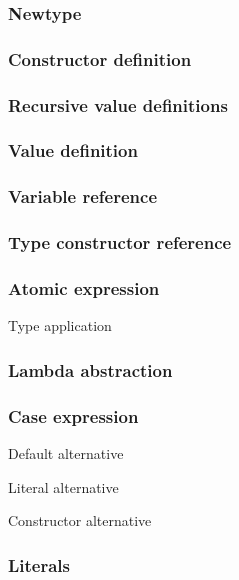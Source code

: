 \subsubsection{Newtype}





\subsubsection{Constructor definition}



\subsubsection{Recursive value definitions}



\subsubsection{Value definition}




\subsubsection{Variable reference}

\subsubsection{Type constructor reference}

\subsubsection{Atomic expression}

Type application

\subsubsection{Lambda abstraction}


\subsubsection{Case expression}

Default alternative

Literal alternative

Constructor alternative


\subsubsection{Literals}





